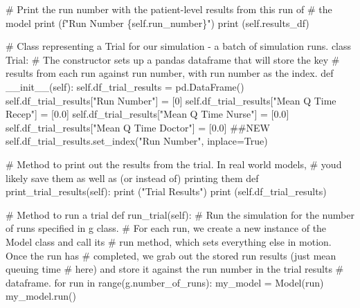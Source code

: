 \documentclass[
  letterpaper,
  DIV=11,
  numbers=noendperiod]{scrreprt}
\newenvironment{Shaded}{\begin{snugshade}}{\end{snugshade}}
\newcommand{\BuiltInTok}[1]{\textcolor[rgb]{0.00,0.23,0.31}{#1}}
\newcommand{\CommentTok}[1]{\textcolor[rgb]{0.37,0.37,0.37}{#1}}
\newcommand{\ControlFlowTok}[1]{\textcolor[rgb]{0.00,0.23,0.31}{#1}}
\newcommand{\DecValTok}[1]{\textcolor[rgb]{0.68,0.00,0.00}{#1}}
\newcommand{\FloatTok}[1]{\textcolor[rgb]{0.68,0.00,0.00}{#1}}
\newcommand{\FunctionTok}[1]{\textcolor[rgb]{0.28,0.35,0.67}{#1}}
\newcommand{\KeywordTok}[1]{\textcolor[rgb]{0.00,0.23,0.31}{#1}}
\newcommand{\NormalTok}[1]{\textcolor[rgb]{0.00,0.23,0.31}{#1}}
\newcommand{\OperatorTok}[1]{\textcolor[rgb]{0.37,0.37,0.37}{#1}}
\newcommand{\SpecialCharTok}[1]{\textcolor[rgb]{0.37,0.37,0.37}{#1}}
\newcommand{\SpecialStringTok}[1]{\textcolor[rgb]{0.13,0.47,0.30}{#1}}
\newcommand{\StringTok}[1]{\textcolor[rgb]{0.13,0.47,0.30}{#1}}
\newcommand{\VariableTok}[1]{\textcolor[rgb]{0.07,0.07,0.07}{#1}}
\begin{document}
\begin{tcolorbox}
\begin{Shaded}
\begin{Highlighting}[]
        \CommentTok{\# Print the run number with the patient{-}level results from this run of}
        \CommentTok{\# the model}
        \BuiltInTok{print}\NormalTok{ (}\SpecialStringTok{f"Run Number }\SpecialCharTok{\{}\VariableTok{self}\SpecialCharTok{.}\NormalTok{run\_number}\SpecialCharTok{\}}\SpecialStringTok{"}\NormalTok{)}
        \BuiltInTok{print}\NormalTok{ (}\VariableTok{self}\NormalTok{.results\_df)}

\CommentTok{\# Class representing a Trial for our simulation {-} a batch of simulation runs.}
\KeywordTok{class}\NormalTok{ Trial:}
    \CommentTok{\# The constructor sets up a pandas dataframe that will store the key}
    \CommentTok{\# results from each run against run number, with run number as the index.}
    \KeywordTok{def}  \FunctionTok{\_\_init\_\_}\NormalTok{(}\VariableTok{self}\NormalTok{):}
        \VariableTok{self}\NormalTok{.df\_trial\_results }\OperatorTok{=}\NormalTok{ pd.DataFrame()}
        \VariableTok{self}\NormalTok{.df\_trial\_results[}\StringTok{"Run Number"}\NormalTok{] }\OperatorTok{=}\NormalTok{ [}\DecValTok{0}\NormalTok{]}
        \VariableTok{self}\NormalTok{.df\_trial\_results[}\StringTok{"Mean Q Time Recep"}\NormalTok{] }\OperatorTok{=}\NormalTok{ [}\FloatTok{0.0}\NormalTok{]}
        \VariableTok{self}\NormalTok{.df\_trial\_results[}\StringTok{"Mean Q Time Nurse"}\NormalTok{] }\OperatorTok{=}\NormalTok{ [}\FloatTok{0.0}\NormalTok{]}
        \VariableTok{self}\NormalTok{.df\_trial\_results[}\StringTok{"Mean Q Time Doctor"}\NormalTok{] }\OperatorTok{=}\NormalTok{ [}\FloatTok{0.0}\NormalTok{] }\CommentTok{\#\#NEW}
        \VariableTok{self}\NormalTok{.df\_trial\_results.set\_index(}\StringTok{"Run Number"}\NormalTok{, inplace}\OperatorTok{=}\VariableTok{True}\NormalTok{)}

    \CommentTok{\# Method to print out the results from the trial.  In real world models,}
    \CommentTok{\# you\textquotesingle{}d likely save them as well as (or instead of) printing them}
    \KeywordTok{def}\NormalTok{ print\_trial\_results(}\VariableTok{self}\NormalTok{):}
        \BuiltInTok{print}\NormalTok{ (}\StringTok{"Trial Results"}\NormalTok{)}
        \BuiltInTok{print}\NormalTok{ (}\VariableTok{self}\NormalTok{.df\_trial\_results)}

    \CommentTok{\# Method to run a trial}
    \KeywordTok{def}\NormalTok{ run\_trial(}\VariableTok{self}\NormalTok{):}
        \CommentTok{\# Run the simulation for the number of runs specified in g class.}
        \CommentTok{\# For each run, we create a new instance of the Model class and call its}
        \CommentTok{\# run method, which sets everything else in motion.  Once the run has}
        \CommentTok{\# completed, we grab out the stored run results (just mean queuing time}
        \CommentTok{\# here) and store it against the run number in the trial results}
        \CommentTok{\# dataframe.}
        \ControlFlowTok{for}\NormalTok{ run }\KeywordTok{in} \BuiltInTok{range}\NormalTok{(g.number\_of\_runs):}
\NormalTok{            my\_model }\OperatorTok{=}\NormalTok{ Model(run)}
\NormalTok{            my\_model.run()}


\end{Highlighting}
\end{Shaded}
\end{tcolorbox}
\end{document}
